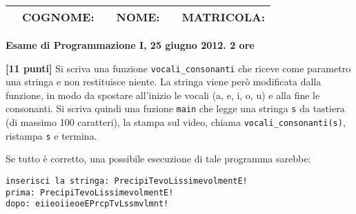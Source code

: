 \documentclass{article}[10pt]
\newcounter{esnu}
\newenvironment{esercizio}{\medskip \noindent {\bf Esercizio\addtocounter{esnu}{1} \arabic{esnu}}}{}
\begin{document}
\begin{tabular}{llclcr}
 \hspace{-35pt} &{\bf COGNOME:} & \hspace{100pt}        &{\bf NOME:}    & \hspace{100pt}        &{\bf MATRICOLA:}\hspace{35pt} \\
\hline
\end{tabular}
\begin{center} {\bf Esame di Programmazione I, 25 giugno 2012. 2 ore}\end{center}

\begin{esercizio}
\textbf{[11 punti]}
Si scriva una funzione \texttt{vocali\_consonanti} che riceve come parametro una stringa
e non restituisce niente. La stringa viene per\`o modificata dalla funzione, in modo da
spostare all'inizio le vocali (a, e, i, o, u) e alla fine le consonanti. Si scriva quindi
una fuzione \texttt{main} che legge una stringa \texttt{s} da tastiera (di massimo 100 caratteri),
la stampa sul video, chiama \texttt{vocali\_consonanti(s)}, ristampa \texttt{s} e termina.

Se tutto \`e corretto, una possibile esecuzione di tale programma sarebbe:
%
\begin{verbatim}
inserisci la stringa: PrecipiTevoLissimevolmentE!
prima: PrecipiTevoLissimevolmentE!
dopo: eiieoiieoeEPrcpTvLssmvlmnt!
\end{verbatim}
%
\end{esercizio}
\end{document}

